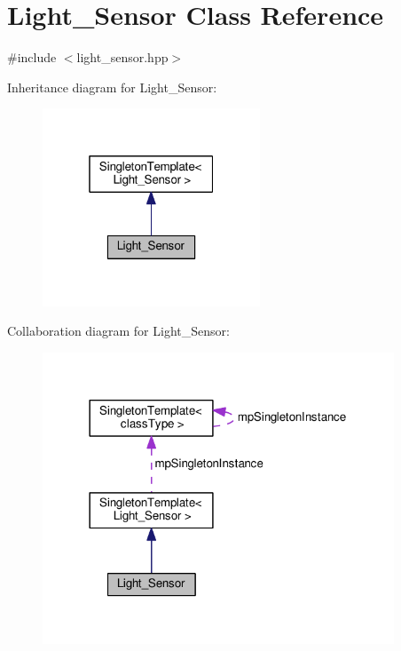 \hypertarget{classLight__Sensor}{}\section{Light\+\_\+\+Sensor Class Reference}
\label{classLight__Sensor}


{\ttfamily \#include $<$light\+\_\+sensor.\+hpp$>$}



Inheritance diagram for Light\+\_\+\+Sensor\+:\nopagebreak
\begin{figure}[H]
\begin{center}
\leavevmode
\includegraphics[width=184pt]{df/d80/classLight__Sensor__inherit__graph}
\end{center}
\end{figure}


Collaboration diagram for Light\+\_\+\+Sensor\+:\nopagebreak
\begin{figure}[H]
\begin{center}
\leavevmode
\includegraphics[width=297pt]{d5/d24/classLight__Sensor__coll__graph}
\end{center}
\end{figure}
